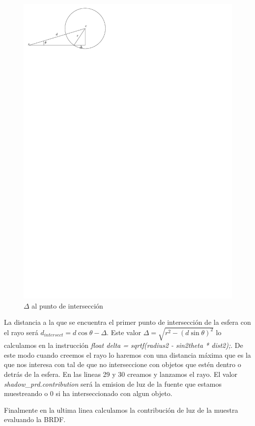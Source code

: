 \begin{figure}[h]
\centering
\includegraphics[scale=1.0]{sample_esfera.pdf}
\caption{  $\Delta $ al punto de intersección}
\end{figure}

La distancia a la que se encuentra el primer punto de intersección de la esfera con el rayo será $d_{intersect} = d \cos\theta - \Delta $. Este valor $\Delta = \sqrt{r^2 - (d\sin\theta)^2}$ lo calculamos en la instrucción \emph{float delta = sqrtf(radius2 - sin2theta * dist2);}. De este modo cuando creemos el rayo lo haremos con una distancia máxima que es la que nos interesa con tal de que no interseccione con objetos que estén dentro o detrás de la esfera. En las lineas 29 y 30 creamos y lanzamos el rayo. El valor \emph{shadow\_prd.contribution} será la emision de luz de la fuente que estamos muestreando o $0$ si ha interseccionado con algun objeto.

\medskip

Finalmente en la ultima linea calculamos la contribución de luz de la muestra evaluando la BRDF.




